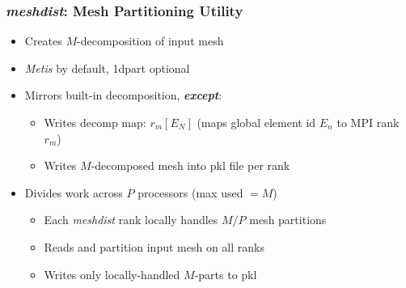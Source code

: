 \begin{frame}\frametitle{\textit{meshdist}: \mirgecom{} Mesh Partitioning Utility}
  \begin{minipage}[t][.4\textheight][t]{\textwidth}
    \begin{multicols}{2}
      \begin{itemize}
      \item Creates $M$-decomposition of input mesh
      \item \textit{Metis} by default, 1dpart optional
      \item Mirrors built-in decomposition, \textbf{\textit{except}}:
          \begin{itemize}
          \item Writes decomp map: $r_m[E_N]$  (maps global element id $E_n$ to MPI rank $r_m$)
          \item Writes $M$-decomposed mesh into pkl file per rank
          \end{itemize}
      \item Divides work across $P$ processors (max used $= M$)
        \begin{itemize}
        \item Each \textit{meshdist} rank locally handles $M/P$ mesh partitions
        \item Reads and partition input mesh on all ranks
        \item Writes only locally-handled $M$-parts to pkl
        \end{itemize}
      \end{itemize}
    \end{multicols}
  \end{minipage}
  \vfill
  \begin{minipage}[b][.4\textheight][t]{\textwidth}
\end{minipage}
\end{frame}
